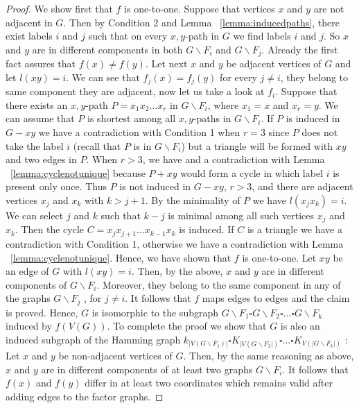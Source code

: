 \documentclass[12pt,a4paper,titlepage,openany]{report}
\begin{document}
\begin{proof}
We show first that $f$ is one-to-one. Suppose that vertices $x$ and $y$ are not adjacent in $G$. Then by Condition 2 and Lemma ~\ref{lemma:inducedpaths}, there exist labels $i$ and $j$ such that on every $x, y$-path in $G$ we find labels $i$ and $j$. So $x$ and $y$ are in different components in both $G\backslash F_i$ and $G\backslash F_j$. Already the first fact assures that $f(x)\neq f(y)$. Let next $x$ and $y$ be adjacent vertices of $G$ and let $l(xy)=i$. We can see that $f_j(x)=f_j(y)$ for every $j\neq i$, they belong to same component they are adjacent, now let us take a look at $f_i$. Suppose that there exists an $x, y$-path $P=x_1x_2\ldots x_r$ in $G\backslash F_i$, where $x_1=x$ and $x_r=y$. We can assume that $P$ is shortest among all $x, y$-paths in $G\backslash F_i$. If $P$ is induced in $G-xy$ we have a contradiction with Condition 1 when $r=3$ since $P$ does not take the label $i$ (recall that $P$ is in $G\backslash F_i$) but a triangle will be formed with $xy$ and two edges in $P$. When $r>3$, we have and a contradiction with Lemma ~\ref{lemma:cyclenotunique} because $P+xy$ would form a cycle in which label $i$  is present only once. Thus $P$ is not induced in $G-xy$,
$r > 3$, and there are adjacent vertices $x_j$ and $x_k$ with $k > j+1$. By the minimality of $P$ we have $l(x_jx_k)=i$. We can select $j$ and $k$ such that $k- j$ is minimal among all such vertices $x_j$ and $x_k$. Then the cycle $C=x_jx_{j+1}\ldots x_{k-1}x_k$ is induced. If $C$ is a triangle we have a contradiction with Condition 1, otherwise we have a
contradiction with Lemma ~\ref{lemma:cyclenotunique}. Hence, we have shown that $f$ is one-to-one.\newline
Let $xy$ be an edge of $G$ with $l(xy)=i$. Then, by the above, $x$ and $y$ are in different components of $G\backslash F_i$. Moreover, they belong to the same component in any of the graphs $G\backslash F_j$ , for $j\neq i$. It follows that $f$ maps edges to edges and the claim is proved.\newline
Hence, $G$ is isomorphic to the subgraph $G\backslash F_1\square G\backslash F_2\square \ldots \square G\backslash F_k$ induced by $f(V(G))$. To complete the proof we show that $G$ is also an induced subgraph of the Hamming graph $k_{|V(G\backslash F_1)|}\square K_{|V(G\backslash F_2|)}\square \ldots \square K_{V(|G\backslash F_k|)}$ :
Let $x$ and $y$ be non-adjacent vertices of $G$. Then, by the same reasoning as above, $x$ and $y$ are in different components of at least two graphs $G\backslash F_i$. It follows that $f(x)$ and $f(y)$ differ in at least two coordinates which remains valid after adding edges to the factor graphs.
\end{proof}
\end{document}
